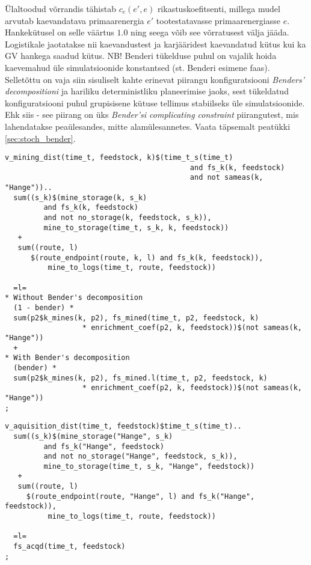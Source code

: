 \documentclass[10pt,a4paper]{article}
\begin{document}
Ülaltoodud võrrandis tähistab $c_e(e', e)$ rikastuskoefitsenti, millega mudel arvutab kaevandatava primaarenergia $e'$ tootestatavasse primaarenergiasse $e$. Hankekütusel on selle väärtus $1.0$ ning seega võib see võrratusest välja jääda. Logistikale jaotatakse nii kaevandustest ja karjääridest kaevandatud kütus kui ka GV hankega saadud kütus. NB! Benderi tükelduse puhul on vajalik hoida kaevemahud üle simulatsioonide konstantsed (st. Benderi esimene faas). Selletõttu on vaja siin sisuliselt kahte erinevat piirangu konfiguratsiooni \emph{Benders' decompositioni} ja hariliku deterministliku planeerimise jaoks, sest tükeldatud konfiguratsiooni puhul grupisisene kütuse tellimus stabiilseks üle simulatsioonide. Ehk siis - see piirang on üks \emph{Bender'si complicating constraint} piirangutest, mis lahendatakse peaülesandes, mitte alamülesannetes. Vaata täpsemalt peatükki \ref{sec:stoch_bender}.
\begin{verbatim}
v_mining_dist(time_t, feedstock, k)$(time_t_s(time_t)
                                           and fs_k(k, feedstock)
                                           and not sameas(k, "Hange"))..
  sum((s_k)$(mine_storage(k, s_k)
         and fs_k(k, feedstock)
         and not no_storage(k, feedstock, s_k)),
         mine_to_storage(time_t, s_k, k, feedstock))
   +
   sum((route, l)
      $(route_endpoint(route, k, l) and fs_k(k, feedstock)),
          mine_to_logs(time_t, route, feedstock))

  =l=
* Without Bender's decomposition
  (1 - bender) *
  sum(p2$k_mines(k, p2), fs_mined(time_t, p2, feedstock, k)
                  * enrichment_coef(p2, k, feedstock))$(not sameas(k, "Hange"))
  +
* With Bender's decomposition
  (bender) *
  sum(p2$k_mines(k, p2), fs_mined.l(time_t, p2, feedstock, k)
                  * enrichment_coef(p2, k, feedstock))$(not sameas(k, "Hange"))
;
\end{verbatim}

\begin{verbatim}
v_aquisition_dist(time_t, feedstock)$time_t_s(time_t)..
  sum((s_k)$(mine_storage("Hange", s_k)
         and fs_k("Hange", feedstock)
         and not no_storage("Hange", feedstock, s_k)),
         mine_to_storage(time_t, s_k, "Hange", feedstock))
   +
   sum((route, l)
     $(route_endpoint(route, "Hange", l) and fs_k("Hange", feedstock)),
          mine_to_logs(time_t, route, feedstock))

  =l=
  fs_acqd(time_t, feedstock)
;
\end{verbatim}
\end{document}
